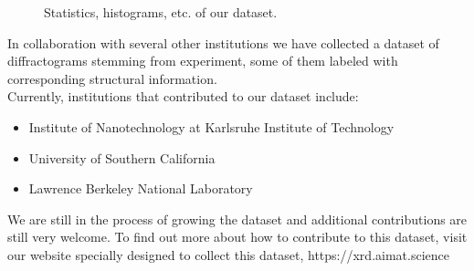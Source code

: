 

\begin{figure*}[!ht]
    \centering
    \missingfigure{} 
    \caption{Statistics, histograms, etc. of our dataset.}
    \label{fig:statistics}
\end{figure*}

In collaboration with several other institutions we have collected a dataset of diffractograms stemming from experiment, some of them labeled with corresponding structural information. \\
Currently, institutions that contributed to our dataset include:
\begin{itemize}
    \item Institute of Nanotechnology at Karlsruhe Institute of Technology
    \item University of Southern California
    \item Lawrence Berkeley National Laboratory
\end{itemize}

We are still in the process of growing the dataset and additional contributions are still very welcome. To find out more about how to contribute to this dataset, visit our website specially designed to collect this dataset, https://xrd.aimat.science \\